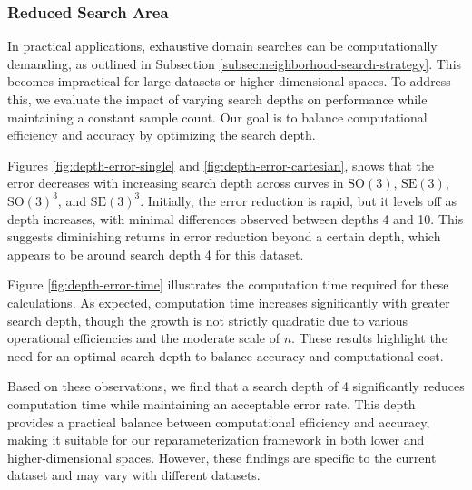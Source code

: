 \subsubsection{Reduced Search Area}
\label{subsubsec:reduced-search-area}

In practical applications, exhaustive domain searches can be computationally demanding, as outlined in Subsection \ref{subsec:neighborhood-search-strategy}. This becomes impractical for large datasets or higher-dimensional spaces. To address this, we evaluate the impact of varying search depths on performance while maintaining a constant sample count. Our goal is to balance computational efficiency and accuracy by optimizing the search depth.

Figures \ref{fig:depth-error-single} and \ref{fig:depth-error-cartesian}, shows that the error decreases with increasing search depth across curves in \(\mathrm{SO}(3)\), \(\mathrm{SE}(3)\), \(\mathrm{SO}(3)^3\), and \(\mathrm{SE}(3)^3\). Initially, the error reduction is rapid, but it levels off as depth increases, with minimal differences observed between depths 4 and 10. This suggests diminishing returns in error reduction beyond a certain depth, which appears to be around search depth 4 for this dataset.

Figure \ref{fig:depth-error-time} illustrates the computation time required for these calculations. As expected, computation time increases significantly with greater search depth, though the growth is not strictly quadratic due to various operational efficiencies and the moderate scale of \(n\). These results highlight the need for an optimal search depth to balance accuracy and computational cost.

Based on these observations, we find that a search depth of 4 significantly reduces computation time while maintaining an acceptable error rate. This depth provides a practical balance between computational efficiency and accuracy, making it suitable for our reparameterization framework in both lower and higher-dimensional spaces. However, these findings are specific to the current dataset and may vary with different datasets.

